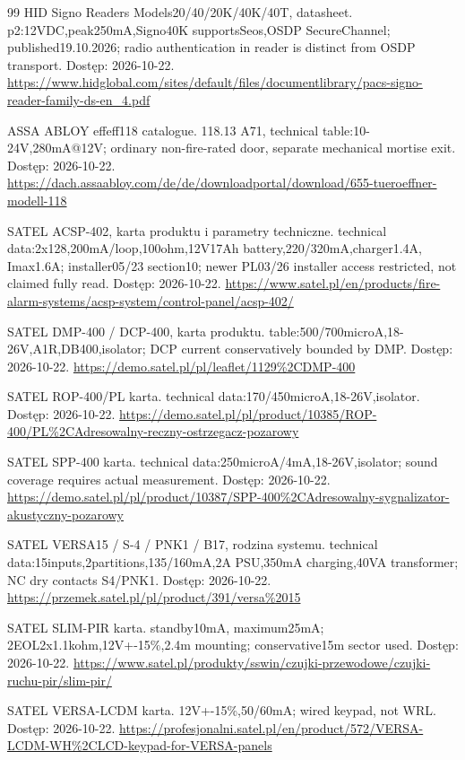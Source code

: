 \begin{thebibliography}{99}
 HID Signo Readers Models20/40/20K/40K/40T, datasheet. p2:12VDC,peak250mA,Signo40K supportsSeos,OSDP SecureChannel; published19.10.2026; radio authentication in reader is distinct from OSDP transport. Dostęp: 2026-10-22.
\url{https://www.hidglobal.com/sites/default/files/documentlibrary/pacs-signo-reader-family-ds-en_4.pdf}

 ASSA ABLOY effeff118 catalogue. 118.13 A71, technical table:10-24V,280mA@12V; ordinary non-fire-rated door, separate mechanical mortise exit. Dostęp: 2026-10-22.
\url{https://dach.assaabloy.com/de/de/downloadportal/download/655-tueroeffner-modell-118}

 SATEL ACSP-402, karta produktu i parametry techniczne. technical data:2x128,200mA/loop,100ohm,12V17Ah battery,220/320mA,charger1.4A, Imax1.6A; installer05/23 section10; newer PL03/26 installer access restricted, not claimed fully read. Dostęp: 2026-10-22.
\url{https://www.satel.pl/en/products/fire-alarm-systems/acsp-system/control-panel/acsp-402/}

 SATEL DMP-400 / DCP-400, karta produktu. table:500/700microA,18-26V,A1R,DB400,isolator; DCP current conservatively bounded by DMP. Dostęp: 2026-10-22.
\url{https://demo.satel.pl/pl/leaflet/1129\%2CDMP-400}

 SATEL ROP-400/PL karta. technical data:170/450microA,18-26V,isolator. Dostęp: 2026-10-22.
\url{https://demo.satel.pl/pl/product/10385/ROP-400/PL\%2CAdresowalny-reczny-ostrzegacz-pozarowy}

 SATEL SPP-400 karta. technical data:250microA/4mA,18-26V,isolator; sound coverage requires actual measurement. Dostęp: 2026-10-22.
\url{https://demo.satel.pl/pl/product/10387/SPP-400\%2CAdresowalny-sygnalizator-akustyczny-pozarowy}

 SATEL VERSA15 / S-4 / PNK1 / B17, rodzina systemu. technical data:15inputs,2partitions,135/160mA,2A PSU,350mA charging,40VA transformer; NC dry contacts S4/PNK1. Dostęp: 2026-10-22.
\url{https://przemek.satel.pl/pl/product/391/versa\%2015}

 SATEL SLIM-PIR karta. standby10mA, maximum25mA; 2EOL2x1.1kohm,12V+-15\%,2.4m mounting; conservative15m sector used. Dostęp: 2026-10-22.
\url{https://www.satel.pl/produkty/sswin/czujki-przewodowe/czujki-ruchu-pir/slim-pir/}

 SATEL VERSA-LCDM karta. 12V+-15\%,50/60mA; wired keypad, not WRL. Dostęp: 2026-10-22.
\url{https://profesjonalni.satel.pl/en/product/572/VERSA-LCDM-WH\%2CLCD-keypad-for-VERSA-panels}


\end{thebibliography}
